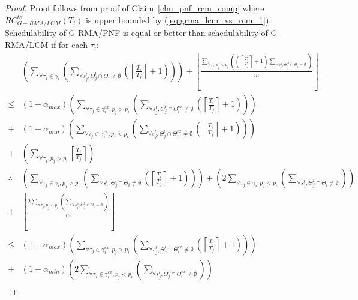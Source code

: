 \begin{proof}\normalfont
%
Proof follows from proof of Claim~\ref{clm_pnf_rcm_comp} where $RC_{G-RMA/LCM}^{to}(T_i)$ is upper bounded by (\ref{eq:grma_lcm_vs_rcm_1}). Schedulability of G-RMA/PNF is equal or better than schedulability of G-RMA/LCM if for each $\tau_i$:
%
\begin{eqnarray}
 & \left(\sum_{\forall\tau_{j}\in\gamma_{i}}\left(\sum_{\forall s_{j}^{l},\Theta_{j}^{l}\cap\Theta_{i}\neq\emptyset}\left(\left\lceil \frac{T_{i}}{T_{j}}\right\rceil +1\right)\right)\right)+\left\lfloor \frac{\sum_{\forall\tau_{j},p_{j}<p_{i}}\left(\left(\left\lceil \frac{T_{i}}{T_{j}}\right\rceil +1\right)\sum_{\forall s_{j}^{h},\Theta_{j}^{h}\cap\Theta_{i}=\emptyset}\right)}{m}\right\rfloor \nonumber \\
\le & \left(1+\alpha_{max}\right)\left(\sum_{\forall\tau_{j}\in\gamma_{i}^{ex},p_{j}>p_{i}}\left(\sum_{\forall s_{j}^{l},\Theta_{j}^{l}\cap\Theta_{i}^{ex}\neq\emptyset}\left(\left\lceil \frac{T_{i}}{T_{j}}\right\rceil +1\right)\right)\right)\nonumber \\
+ & \left(1-\alpha_{min}\right)\left(\sum_{\forall\tau_{j}\in\gamma_{i}^{ex},p_{j}<p_{i}}\left(\sum_{\forall s_{j}^{l},\Theta_{j}^{l}\cap\Theta_{i}^{ex}\neq\emptyset}\left(\left\lceil \frac{T_{i}}{T_{j}}\right\rceil +1\right)\right)\right)\nonumber \\
+ & \left(\sum_{\forall\tau_{j},p_{j}>p_{i}}\left\lceil \frac{T_{i}}{T_{j}}\right\rceil \right)
\label{eq:pnf_vs_grma_lcm_1}
\end{eqnarray}
%
\begin{eqnarray}
\therefore & \left(\sum_{\forall\tau_{j}\in\gamma_{i},p_{j}>p_{i}}\left(\sum_{\forall s_{j}^{l},\Theta_{j}^{l}\cap\Theta_{i}\neq\emptyset}\left(\left\lceil \frac{T_{i}}{T_{j}}\right\rceil +1\right)\right)\right)+\left(2\sum_{\forall\tau_{j}\in\gamma_{i},p_{j}<p_{i}}\left(\sum_{\forall s_{j}^{l},\Theta_{j}^{l}\cap\Theta_{i}\neq\emptyset}\right)\right)\nonumber \\
+ & \left\lfloor \frac{2\sum_{\forall\tau_{j},p_{j}<p_{i}}\left(\sum_{\forall s_{j}^{h},\Theta_{j}^{h}\cap\Theta_{i}=\emptyset}\right)}{m}\right\rfloor \nonumber \\
\le & \left(1+\alpha_{max}\right)\left(\sum_{\forall\tau_{j}\in\gamma_{i}^{ex},p_{j}>p_{i}}\left(\sum_{\forall s_{j}^{l},\Theta_{j}^{l}\cap\Theta_{i}^{ex}\neq\emptyset}\left(\left\lceil \frac{T_{i}}{T_{j}}\right\rceil +1\right)\right)\right)\nonumber \\
+ & \left(1-\alpha_{min}\right)\left(2\sum_{\forall\tau_{j}\in\gamma_{i}^{ex},p_{j}<p_{i}}\left(\sum_{\forall s_{j}^{l},\Theta_{j}^{l}\cap\Theta_{i}^{ex}\neq\emptyset}\right)\right)\nonumber \\

\end{eqnarray}
\end{proof}
